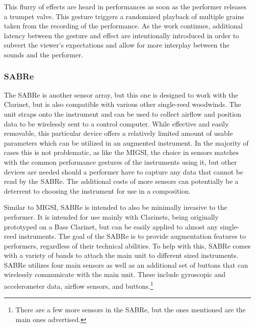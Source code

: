 This flurry of effects are heard in performances as soon as the performer releases a trumpet valve\cite{reid_2019}. This gesture triggers a randomized playback of multiple grains taken from the recording of the performance. As the work continues, additional latency between the gesture and effect are intentionally introduced in order to subvert the viewer's expectations and allow for more interplay between the sounds and the performer\cite{reid_2019}.


\subsubsection{SABRe}

The SABRe is another sensor array, but this one is designed to work with the Clarinet, but is also compatible with various other single-reed woodwinds. The unit straps onto the instrument and can be used to collect airflow and position data to be wirelessly sent to a control computer. While effective and easily removable, this particular device offers a relatively limited amount of usable parameters which can be utilized in an augmented instrument. In the majority of cases this is not problematic, as like the MIGSI, the choice in sensors matches with the common performance gestures of the instruments using it, but other devices are needed should a performer have to capture any data that cannot be read by the SABRe. The additional costs of more sensors can potentially be a deterrent to choosing the instrument for use in a composition.

Similar to MIGSI, SABRe is intended to also be minimally invasive to the performer. It is intended for use mainly with Clarinets, being originally prototyped on a Bass Clarinet, but can be easily applied to almost any single-reed instruments\cite{Schiesser2012}. The goal of the SABRe is to provide augmentation features to performers, regardless of their technical abilities\cite{Schiesser2012}. To help with this, SABRe comes with a variety of bands to attach the main unit to different sized instruments. SABRe utilizes four main sensors as well as an additional set of buttons that can wirelessly communicate with the main unit. These include gyroscopic and accelerometer data, airflow sensors, and buttons.\footnote{There are a few more sensors in the SABRe, but the ones mentioned are the main ones advertised.}

